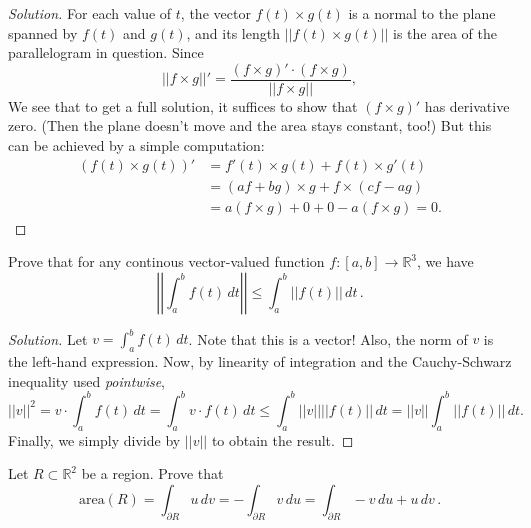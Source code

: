 \documentclass[Shifrin_Solutions_Spring_2015]{subfiles}
\begin{document}
\begin{proof}[Solution]
For each value of $t$, the vector $f(t) \times g(t)$ is a normal to the plane spanned by $f(t)$ and $g(t)$, and its length $||f(t) \times g(t)||$ is the area of the parallelogram in question. Since
\[
||f \times g||' = \dfrac{(f\times g)' \cdot (f\times g)}{||f\times g||} ,
\]
We see that to get a full solution, it suffices to show that $(f\times g)'$ has derivative zero. (Then the plane doesn't move and the area stays constant, too!) But this can be achieved by a simple computation:
\[
\begin{split}
(f(t)\times g(t) )' & = f'(t) \times g(t) + f(t) \times g'(t) \\
& = (af + bg ) \times g + f \times (c f - a g) \\
& = a ( f\times g) + 0 + 0 - a ( f\times g) = 0.
\end{split}
\]

\end{proof}


\vspace{1cm}


\begin{exercise}
Prove that for any continous vector-valued function $f:[a,b]\rightarrow \mathbb{R}^3$, we have
\[
\left|\left| \int_a^b f(t) \, dt \right| \right| \leq \int_a^b ||f(t)||\, dt\, .
\]
\end{exercise}

\begin{proof}[Solution]
Let $v = \int_a^b f(t)\, dt$. Note that this is a vector! Also, the norm of $v$ is the left-hand expression. Now, by linearity of integration and the Cauchy-Schwarz inequality used \emph{pointwise},
\[
||v||^2 = v \cdot \int_a^b f(t)\, dt = \int_a^b v\cdot f(t) \, dt \leq \int_a^b ||v|| ||f(t)|| \, dt = ||v|| \int_a^b ||f(t)|| \, dt .
\]
Finally, we simply divide by $||v||$ to obtain the result.

\end{proof}

\vspace{1cm}

\begin{exercise} Let $R\subset \mathbb{R}^2$ be a region. Prove that
\[
\text{area}(R) = \int_{\partial R} u\, dv = -\int_{\partial R} v\, du = \int_{\partial R} -v\, du + u\, dv\, .
\]
\end{exercise}
\end{document}
